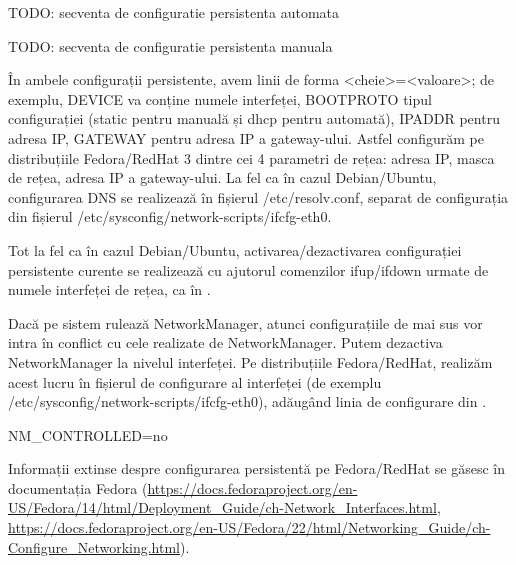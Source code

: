 \begin{screen}[caption={Configurare persistentă automată pe Fedora/RedHat},label={lst:net:persistent-automatic-redhat}]
TODO: secventa de configuratie persistenta automata
\end{screen}

\begin{screen}[caption={Configurare persistentă manuală pe Fedora/RedHat},label={lst:net:persistent-manual-redhat}]
TODO: secventa de configuratie persistenta manuala
\end{screen}

În ambele configurații persistente, avem linii de forma <cheie>=<valoare>; de exemplu, DEVICE va conține numele interfeței, BOOTPROTO tipul configurației (static pentru manuală și dhcp pentru automată), IPADDR pentru adresa IP, GATEWAY pentru adresa IP a gateway-ului. Astfel configurăm pe distribuțiile Fedora/RedHat 3 dintre cei 4 parametri de rețea: adresa IP, masca de rețea, adresa IP a gateway-ului. La fel ca în cazul Debian/Ubuntu, configurarea DNS se realizează în fișierul /etc/resolv.conf, separat de configurația din fișierul /etc/sysconfig/network-scripts/ifcfg-eth0.

Tot la fel ca în cazul Debian/Ubuntu, activarea/dezactivarea configurației persistente curente se realizează cu ajutorul comenzilor ifup/ifdown urmate de numele interfeței de rețea, ca în .

Dacă pe sistem rulează NetworkManager, atunci configurațiile de mai sus vor intra în conflict cu cele realizate de NetworkManager. Putem dezactiva NetworkManager la nivelul interfeței. Pe distribuțiile Fedora/RedHat, realizăm acest lucru în fișierul de configurare al interfeței (de exemplu /etc/sysconfig/network-scripts/ifcfg-eth0), adăugând linia de configurare din .

\begin{screen}[caption={Dezactivare NetworkManager la nivelul interfeței în RedHat},label={lst:net:disable-nm-if-redhat}]
NM_CONTROLLED=no
\end{screen}

Informații extinse despre configurarea persistentă pe Fedora/RedHat se găsesc în documentația Fedora (\url{https://docs.fedoraproject.org/en-US/Fedora/14/html/Deployment_Guide/ch-Network_Interfaces.html}, \url{https://docs.fedoraproject.org/en-US/Fedora/22/html/Networking_Guide/ch-Configure_Networking.html}).

